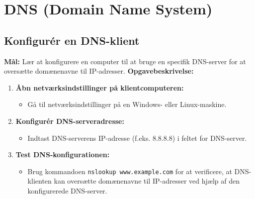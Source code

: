 \section{DNS (Domain Name System)}
\subsection{Konfigurér en DNS-klient}
\textbf{Mål:} Lær at konfigurere en computer til at bruge en specifik DNS-server for at oversætte domænenavne til IP-adresser.
\newline\newline\noindent
\textbf{Opgavebeskrivelse:}
\begin{enumerate}
	\item \textbf{Åbn netværksindstillinger på klientcomputeren:}
	\begin{itemize}
		\item Gå til netværksindstillinger på en Windows- eller Linux-maskine.
	\end{itemize}
	\item \textbf{Konfigurér DNS-serveradresse:}
	\begin{itemize}
		\item Indtast DNS-serverens IP-adresse (f.eks. 8.8.8.8) i feltet for DNS-server.
	\end{itemize}
	\item \textbf{Test DNS-konfigurationen:}
	\begin{itemize}
		\item Brug kommandoen \texttt{nslookup www.example.com} for at verificere, at DNS-klienten kan oversætte domænenavne til IP-adresser ved hjælp af den konfigurerede DNS-server.
	\end{itemize}
\end{enumerate}

